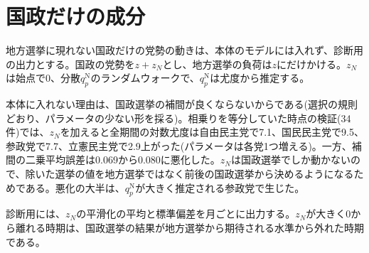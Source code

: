 \documentclass[a4paper,11pt]{ltjsarticle}
\begin{document}
\section{国政だけの成分}

地方選挙に現れない国政だけの党勢の動きは、本体のモデルには入れず、診断用の出力とする。国政の党勢を$z+z_N$とし、地方選挙の負荷は$z$にだけかける。$z_N$は始点で0、分散$q^{\mathrm{N}}_p$のランダムウォークで、$q^{\mathrm{N}}_p$は尤度から推定する。

本体に入れない理由は、国政選挙の補間が良くならないからである(選択の規則どおり、パラメータの少ない形を採る)。相乗りを等分していた時点の検証(34件)では、$z_N$を加えると全期間の対数尤度は自由民主党で7.1、国民民主党で9.5、参政党で7.7、立憲民主党で2.9上がった(パラメータは各党1つ増える)。一方、補間の二乗平均誤差は0.069から0.080に悪化した。$z_N$は国政選挙でしか動かないので、除いた選挙の値を地方選挙ではなく前後の国政選挙から決めるようになるためである。悪化の大半は、$q^{\mathrm{N}}_p$が大きく推定される参政党で生じた。

診断用には、$z_N$の平滑化の平均と標準偏差を月ごとに出力する。$z_N$が大きく0から離れる時期は、国政選挙の結果が地方選挙から期待される水準から外れた時期である。
\end{document}
